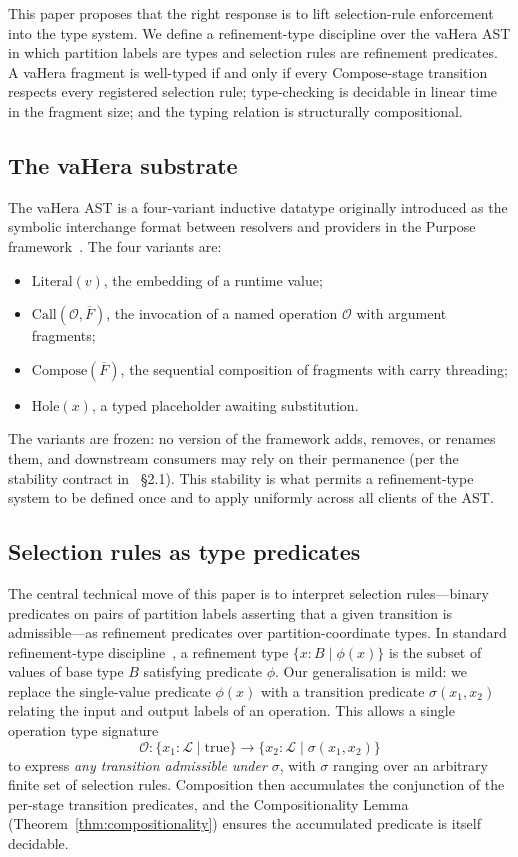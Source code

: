 \documentclass[twocolumn,11pt,a4paper]{article}
\newcommand{\Lab}{\mathcal{L}}
\newcommand{\Sel}{\sigma}
\newcommand{\Frag}{F}
\newcommand{\Op}{\mathcal{O}}
\newcommand{\vCall}[2]{\mathrm{Call}(#1,#2)}
\newcommand{\vComp}[1]{\mathrm{Compose}(#1)}
\newcommand{\vLit}[1]{\mathrm{Literal}(#1)}
\newcommand{\vHol}[1]{\mathrm{Hole}(#1)}
\begin{document}
This paper proposes that the right response is to lift selection-rule enforcement into the type system. We define a refinement-type discipline over the vaHera AST in which partition labels are types and selection rules are refinement predicates. A vaHera fragment is well-typed if and only if every $\mathrm{Compose}$-stage transition respects every registered selection rule; type-checking is decidable in linear time in the fragment size; and the typing relation is structurally compositional.

\subsection{The vaHera substrate}

The vaHera AST is a four-variant inductive datatype originally introduced as the symbolic interchange format between resolvers and providers in the Purpose framework~\citep{sachikonye2026integration}. The four variants are:
\begin{itemize}[nosep,leftmargin=*]
\item $\vLit{v}$, the embedding of a runtime value;
\item $\vCall{\Op}{\overline{\Frag}}$, the invocation of a named operation $\Op$ with argument fragments;
\item $\vComp{\overline{\Frag}}$, the sequential composition of fragments with carry threading;
\item $\vHol{x}$, a typed placeholder awaiting substitution.
\end{itemize}
The variants are frozen: no version of the framework adds, removes, or renames them, and downstream consumers may rely on their permanence (per the stability contract in~\citealp{sachikonye2026integration} §2.1). This stability is what permits a refinement-type system to be defined once and to apply uniformly across all clients of the AST.

\subsection{Selection rules as type predicates}

The central technical move of this paper is to interpret selection rules---binary predicates on pairs of partition labels asserting that a given transition is admissible---as refinement predicates over partition-coordinate types. In standard refinement-type discipline~\citep{rondon2008liquid,vazou2014refinement,freeman1991refinement}, a refinement type $\{x : B \mid \phi(x)\}$ is the subset of values of base type $B$ satisfying predicate $\phi$. Our generalisation is mild: we replace the single-value predicate $\phi(x)$ with a transition predicate $\Sel(x_1, x_2)$ relating the input and output labels of an operation. This allows a single operation type signature
\[
\Op : \{x_1 : \Lab \mid \mathrm{true}\} \to \{x_2 : \Lab \mid \Sel(x_1, x_2)\}
\]
to express \emph{any transition admissible under $\Sel$}, with $\Sel$ ranging over an arbitrary finite set of selection rules. Composition then accumulates the conjunction of the per-stage transition predicates, and the Compositionality Lemma (Theorem~\ref{thm:compositionality}) ensures the accumulated predicate is itself decidable.
\end{document}
